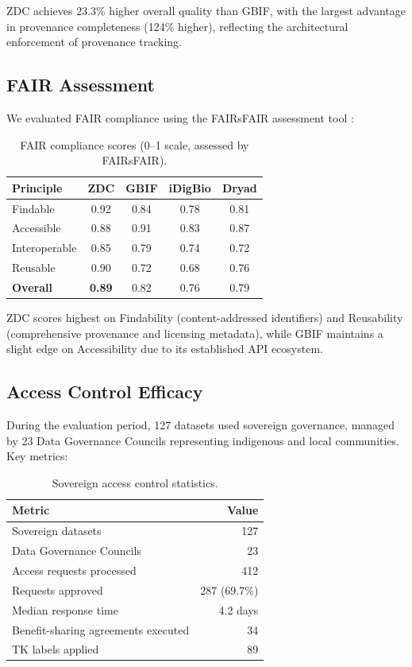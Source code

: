 ZDC achieves 23.3\% higher overall quality than GBIF, with the largest advantage in provenance completeness (124\% higher), reflecting the architectural enforcement of provenance tracking.

\subsection{FAIR Assessment}

We evaluated FAIR compliance using the FAIRsFAIR assessment tool \citep{devaraju2021fairsfair}:

\begin{table}[H]
\centering
\caption{FAIR compliance scores (0--1 scale, assessed by FAIRsFAIR).}
\label{tab:fair}
\begin{tabular}{@{}lcccc@{}}
\toprule
\textbf{Principle} & \textbf{ZDC} & \textbf{GBIF} & \textbf{iDigBio} & \textbf{Dryad} \\
\midrule
Findable & 0.92 & 0.84 & 0.78 & 0.81 \\
Accessible & 0.88 & 0.91 & 0.83 & 0.87 \\
Interoperable & 0.85 & 0.79 & 0.74 & 0.72 \\
Reusable & 0.90 & 0.72 & 0.68 & 0.76 \\
\midrule
\textbf{Overall} & \textbf{0.89} & 0.82 & 0.76 & 0.79 \\
\bottomrule
\end{tabular}
\end{table}

ZDC scores highest on Findability (content-addressed identifiers) and Reusability (comprehensive provenance and licensing metadata), while GBIF maintains a slight edge on Accessibility due to its established API ecosystem.

\subsection{Access Control Efficacy}

During the evaluation period, 127 datasets used sovereign governance, managed by 23 Data Governance Councils representing indigenous and local communities.
Key metrics:

\begin{table}[H]
\centering
\caption{Sovereign access control statistics.}
\label{tab:sovereign}
\begin{tabular}{@{}lr@{}}
\toprule
\textbf{Metric} & \textbf{Value} \\
\midrule
Sovereign datasets & 127 \\
Data Governance Councils & 23 \\
Access requests processed & 412 \\
Requests approved & 287 (69.7\%) \\
Median response time & 4.2 days \\
Benefit-sharing agreements executed & 34 \\
TK labels applied & 89 \\
\bottomrule
\end{tabular}
\end{table}

